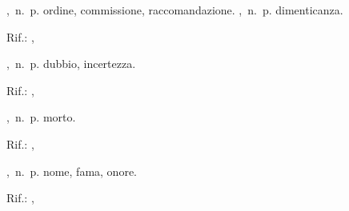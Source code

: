 ,\ n.\ p.
ordine, commissione, raccomandazione.
,\ n.\ p.
dimenticanza.
\begin{subvocedue}
\item[Rif.:] , 
\end{subvocedue}
,\ n.\ p.
dubbio, incertezza.
\begin{subvocedue}
\item[Rif.:] , 
\end{subvocedue}
,\ n.\ p.
morto.
\begin{subvocedue}
\item[Rif.:] , 
\end{subvocedue}
,\ n.\ p.
nome, fama, onore.
\begin{subvocedue}
\item[Rif.:] , 
\end{subvocedue}
